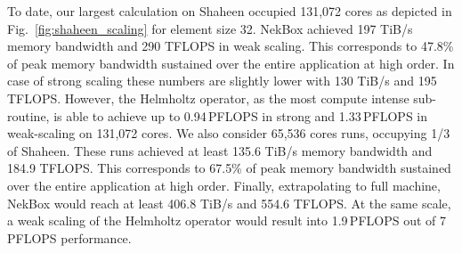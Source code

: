 To date, our largest calculation on Shaheen occupied 131,072 cores as depicted in Fig.~\ref{fig:shaheen_scaling}
for element size 32.
NekBox achieved 197 TiB/s memory bandwidth and 290 TFLOPS in weak scaling.
This corresponds to 47.8\% of peak memory bandwidth sustained over the entire application at high order.
In case of strong scaling these numbers are slightly lower with 130 TiB/s and 195 TFLOPS. 
However, the Helmholtz operator, as the most compute intense sub-routine, is able to achieve
up to 0.94\,PFLOPS in strong and 1.33\,PFLOPS
 in weak-scaling on 131,072 cores. %
We also consider 65,536 cores runs, occupying 1/3 of Shaheen.
These runs achieved at least 135.6 TiB/s memory bandwidth and 184.9 TFLOPS.
This corresponds to 67.5\% of peak memory bandwidth sustained over the entire application at high order.
Finally, extrapolating to full machine, NekBox would reach at least 406.8 TiB/s and 554.6 TFLOPS. At the same scale,
a weak scaling of the Helmholtz operator would result into 1.9\,PFLOPS out of 7\,PFLOPS performance.



